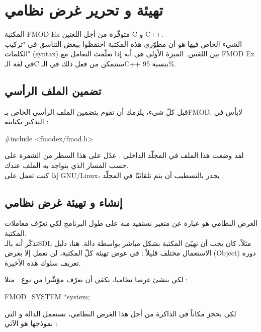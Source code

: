 \section{تهيئة و تحرير غرض نظامي}

المكتبة
\textenglish{FMOD Ex}
متوفّرة من أجل اللغتين
\textenglish{C}
و
\textenglish{C++}.\\
الشيء الخاص فيها هو أن مطوّري هذه المكتبة احتفظوا ببعض التناسق في "تركيب الكلمات"
(\textenglish{syntax})
بين اللغتين. الميزة الأولى هي أنه إذا تعلّمت التعامل مع
\textenglish{FMOD Ex}
في لغة الـ\textenglish{C}
ستتمكن من فعل ذلك في الـ\textenglish{C++}
بنسبة 95\%.

\subsection{تضمين الملف الرأسي}

قبل كلّ شيء، يلزمك أن تقوم بتضمين الملف الرأسي الخاص بـ\textenglish{FMOD}.
 لابأس في التذكير بكتابته :

\begin{Csource}
#include <fmodex/fmod.h>
\end{Csource}

لقد وضعت هذا الملف في المجلّد الداخلي
.
عدّل على هذا السطر من الشفرة على حسب المسار الذي يتواجد به الملف عندك.\\
إذا كنت تعمل على
\mbox{\textenglish{GNU/Linux}}،
 يجدر بالتسطيب أن يتم تلقائيّا في المجلّد
.

\subsection{إنشاء و تهيئة غرض نظامي}

الغرض النظامي هو عبارة عن متغير نستفيد منه على طول البرنامج لكي نعرّف معاملات المكتبة.\\
تذكّر أنه بالـ\textenglish{SDL}
مثلاً، كان يجب أن نهيّئ المكتبة بشكل مباشر بواسطة دالة. هنا، دليل الاستعمال مختلف قليلاً : في عوض تهيئة كلّ المكتبة، لن نعمل إلا بغرض
(\textenglish{Object})
دوره تعريف سلوك هذه الأخيرة.

لكي ننشئ غرضا نظاميا، يكفي أن نعرّف مؤشّرا من نوع
.
مثلا :

\begin{Csource}
FMOD_SYSTEM *system;
\end{Csource}

لكي نحجز مكاناً في الذاكرة من أجل هذا الغرض النظامي، نستعمل الدالة
و التي نموذجها هو الآتي :

